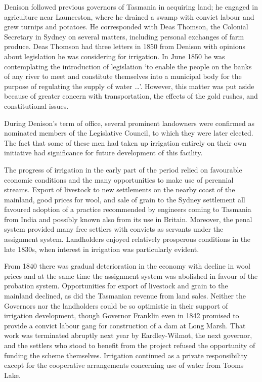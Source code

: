 Denison followed previous governors of Tasmania in acquiring land; he
engaged in agriculture near Launceston, where he drained a swamp with
convict labour  and grew turnips and potatoes.
He corresponded with Deas Thomson,  the Colonial
Secretary in Sydney on several matters, including personal exchanges
of farm produce.  Deas Thomson had three letters in 1850 from Denison
with opinions about legislation he was considering for irrigation.  In
June 1850 he was contemplating the introduction of legislation `to
enable the people on the banks of any river to meet and constitute
themselves into a municipal body for the purpose of regulating the
supply of water \ldots'.  However, this matter was put aside because
of greater concern with transportation, the effects of the gold
rushes,  and constitutional issues.

During Denison's term of office, several prominent landowners were
confirmed as nominated members of the Legislative Council, to which
they were later elected.  The fact that some of these men had taken up
irrigation entirely on their own initiative had significance for
future development of this facility.

\closure The progress of irrigation in the early part of the period
relied on fav\-our\-able economic conditions and the many
opportunities to make use of perennial streams.  Export of livestock
to new settlements on the nearby coast of the mainland, good prices
for wool,  and sale of grain to the Sydney
settlement all favoured adoption of a practice recommended by
engineers coming to Tasmania from India and possibly known also from
its use in Britain.  Moreover, the penal system provided many free
settlers with convicts as servants under the assignment system.
Landholders enjoyed relatively prosperous conditions in the late
1830s, when interest in irrigation was particularly evident.

From 1840 there was gradual deterioration in the economy with decline
in wool prices and at the same time the assignment system was
abolished in favour of the probation system.  Opportunities for export
of livestock and grain to the mainland declined, as did the Tasmanian
revenue from land sales.  Neither the Governors nor the landholders
could be so optimistic in their support of irrigation development,
though Governor Franklin  even in 1842
promised to provide a convict labour gang for construction of a
dam at Long Marsh.  That work was terminated
abruptly next year by Eardley-Wilmot, 
the next governor, and the settlers who stood to benefit from the
project refused the opportunity of funding the scheme themselves.
Irrigation continued as a private responsibility except for the
cooperative arrangements concerning use of water from Tooms
Lake. 

